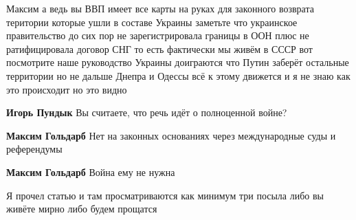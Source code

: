 \begin{itemize}

Максим а ведь вы ВВП имеет все карты на руках для законного возврата територии
которые ушли в составе Украины заметьте что украинское правительство до сих пор
не зарегистрировала границы в ООН плюс не ратифицировала договор СНГ то есть
фактически мы живём в СССР вот посмотрите наше руководство Украины доиграются
что Путин заберёт остальные территории но не дальше Днепра и Одессы всё к этому
движется и я не знаю как это происходит но это видно

\begin{itemize}
 
\textbf{Игорь Пундык} Вы считаете, что речь идёт о полноценной войне?

 
\textbf{Максим Гольдарб} Нет на законных основаниях через международные суды и референдумы

 
\textbf{Максим Гольдарб} Война ему не нужна

 
Я прочел статью и там просматриваются как минимум три посыла либо вы живёте мирно либо будем прощатся

 

\end{itemize}
\end{itemize}
